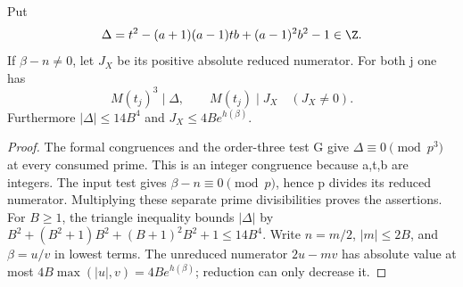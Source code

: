 \begin{lemma}\label{q198:residual-divisibility}
Put
\[
 \Delta=t^2-(a+1)(a-1)tb+(a-1)^2b^2-1\in\Z.
\]
If $\beta-n\ne0$, let $J_X$ be its positive absolute reduced
numerator. For both j one has
\[
 M(t_j)^3\mid\Delta,\qquad M(t_j)\mid J_X\quad(J_X\ne0).
\]
Furthermore $|\Delta|\le14B^4$ and $J_X\le4B e^{h(\beta)}$.
\end{lemma}
\begin{proof}
The formal congruences and the order-three test G give
$\Delta\equiv0\pmod{p^3}$ at every consumed prime. This is an
integer congruence because a,t,b are integers. The input test gives
$\beta-n\equiv0\pmod p$, hence p divides its reduced numerator.
Multiplying these separate prime divisibilities proves the assertions.
For $B\ge1$, the triangle inequality bounds $|\Delta|$ by
$B^2+(B^2+1)B^2+(B+1)^2B^2+1\le14B^4$.
Write $n=m/2$, $|m|\le2B$, and $\beta=u/v$ in lowest terms.
The unreduced numerator $2u-mv$ has absolute value at most
$4B\max(|u|,v)=4Be^{h(\beta)}$; reduction can only decrease it.
\end{proof}

